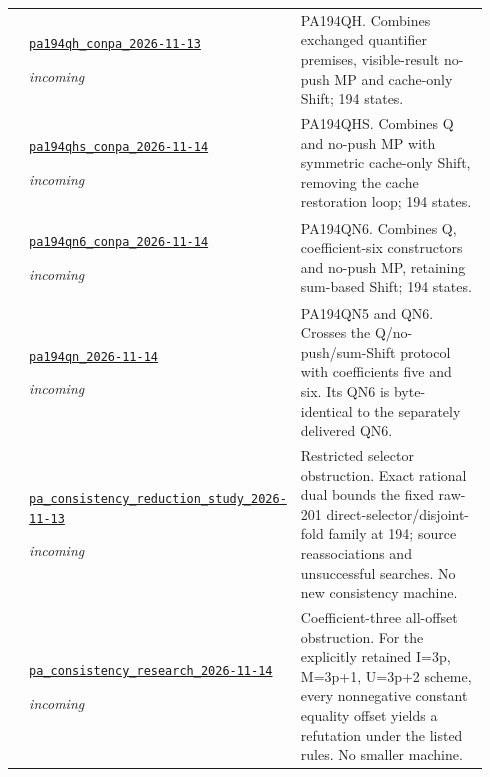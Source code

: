 {\begin{longtable}{@{}>{\raggedright\arraybackslash}p{0.035\linewidth}>{\raggedright\arraybackslash}p{0.345\linewidth}>{\raggedright\arraybackslash}p{0.56\linewidth}@{}}
65 & \href{https://github.com/VladimirReshetnikov/ProveIt/blob/1c9524d8bf2e0a27b9a16ff622359927f536e663/docs/incoming/pa194qh_conpa_2026-11-13.zip}{\nolinkurl{pa194qh_conpa_2026-11-13}}\par\emph{incoming} & PA194QH. Combines exchanged quantifier premises, visible-result no-push MP and cache-only Shift; 194 states.\\[4pt]
66 & \href{https://github.com/VladimirReshetnikov/ProveIt/blob/1c9524d8bf2e0a27b9a16ff622359927f536e663/docs/incoming/pa194qhs_conpa_2026-11-14.zip}{\nolinkurl{pa194qhs_conpa_2026-11-14}}\par\emph{incoming} & PA194QHS. Combines Q and no-push MP with symmetric cache-only Shift, removing the cache restoration loop; 194 states.\\[4pt]
67 & \href{https://github.com/VladimirReshetnikov/ProveIt/blob/1c9524d8bf2e0a27b9a16ff622359927f536e663/docs/incoming/pa194qn6_conpa_2026-11-14.zip}{\nolinkurl{pa194qn6_conpa_2026-11-14}}\par\emph{incoming} & PA194QN6. Combines Q, coefficient-six constructors and no-push MP, retaining sum-based Shift; 194 states.\\[4pt]
68 & \href{https://github.com/VladimirReshetnikov/ProveIt/blob/1c9524d8bf2e0a27b9a16ff622359927f536e663/docs/incoming/pa194qn_2026-11-14.zip}{\nolinkurl{pa194qn_2026-11-14}}\par\emph{incoming} & PA194QN5 and QN6. Crosses the Q/no-push/sum-Shift protocol with coefficients five and six. Its QN6 is byte-identical to the separately delivered QN6.\\[4pt]
69 & \href{https://github.com/VladimirReshetnikov/ProveIt/blob/1c9524d8bf2e0a27b9a16ff622359927f536e663/docs/incoming/pa_consistency_reduction_study_2026-11-13.zip}{\nolinkurl{pa_consistency_reduction_study_2026-11-13}}\par\emph{incoming} & Restricted selector obstruction. Exact rational dual bounds the fixed raw-201 direct-selector/disjoint-fold family at 194; source reassociations and unsuccessful searches. No new consistency machine.\\[4pt]
70 & \href{https://github.com/VladimirReshetnikov/ProveIt/blob/1c9524d8bf2e0a27b9a16ff622359927f536e663/docs/incoming/pa_consistency_research_2026-11-14.zip}{\nolinkurl{pa_consistency_research_2026-11-14}}\par\emph{incoming} & Coefficient-three all-offset obstruction. For the explicitly retained I=3p, M=3p+1, U=3p+2 scheme, every nonnegative constant equality offset yields a refutation under the listed rules. No smaller machine.\\[4pt]

\end{longtable}}
